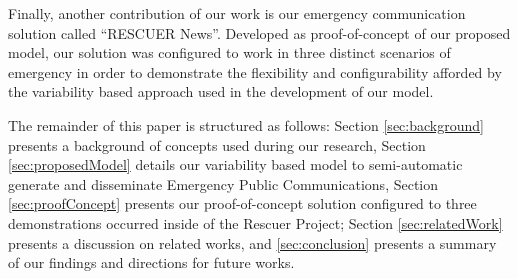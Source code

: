 Finally, another contribution of our work is our emergency communication solution called ``RESCUER News''. Developed as proof-of-concept of our proposed model, our solution was configured to work in three distinct scenarios of emergency in order to demonstrate the flexibility and configurability afforded by the variability based approach used in the development of our model. 


The remainder of this paper is structured as follows: Section \ref{sec:background} presents a background of concepts used during our research, Section \ref{sec:proposedModel} details our variability based model to semi-automatic generate and disseminate Emergency Public Communications, Section \ref{sec:proofConcept} presents our proof-of-concept solution configured to three demonstrations occurred inside of the Rescuer Project; Section \ref{sec:relatedWork} presents a discussion on related works, and \ref{sec:conclusion} presents a summary of our findings and directions for future works.

